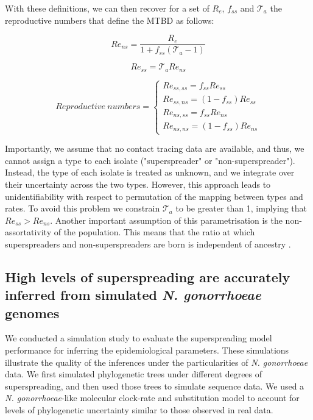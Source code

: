 \documentclass[lineno,pdflatex,sn-nature]{sn-jnl}%
\theoremstyle{thmstyleone}%
\theoremstyle{thmstyletwo}%
\theoremstyle{thmstylethree}%
\begin{document}
With these definitions, we can then recover for a set of $R_e$, $f_{ss}$ and $\mathcal{T}_a$ the reproductive numbers that define the MTBD as follows: 

$$
Re_{ns} = \frac{R_e}{1 + f_{ss}(\mathcal{T}_a -1)}
$$

$$
Re_{ss} = \mathcal{T}_aRe_{ns}
$$

$$
Reproductive \ numbers = 
\begin{cases}
Re_{ss,ss} = f_{ss}Re_{ss} \\
Re_{ss,ns} = (1 - f_{ss})Re_{ss} \\
Re_{ns,ss} = f_{ss}Re_{ns} \\
Re_{ns,ns} = (1 - f_{ss})Re_{ns} 
\end{cases}
$$\newline

Importantly, we assume that no contact tracing data are available, and thus, we cannot assign a type to each isolate ("superspreader" or "non-superspreader"). Instead, the type of each isolate is treated as unknown, and we integrate over their uncertainty across the two types. However, this approach leads to unidentifiability with respect to permutation of the mapping between types and rates. To avoid this problem we constrain $\mathcal{T}_a$ to be greater than 1, implying that $Re_{ss} > Re_{ns}$. Another important assumption of this parametrisation is the non-assortativity of the population. This means that the ratio at which superspreaders and non-superspreaders are born is independent of ancestry \cite{ramussen2017phylo}.

\subsection{High levels of superspreading are accurately inferred from simulated \textit{N. gonorrhoeae} genomes }
We conducted a simulation study to evaluate the superspreading model performance for inferring the epidemiological parameters. These simulations illustrate the quality of the inferences under the particularities of \textit{N. gonorrhoeae} data. We first simulated phylogenetic trees under different degrees of superspreading, and then used those trees to simulate sequence data. We used a \textit{N. gonorrhoeae}-like molecular clock-rate and substitution model to account for levels of phylogenetic uncertainty similar to those observed in real data.\newline 
\end{document}
